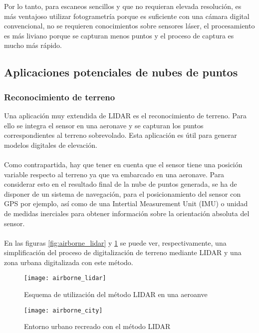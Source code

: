 
Por lo tanto, para escaneos sencillos y que no requieran elevada resolución, es más ventajoso utilizar fotogrametría porque es suficiente con una cámara digital convencional, no se requieren conocimientos sobre sensores láser, el procesamiento es más liviano porque se capturan menos puntos y el proceso de captura es mucho más rápido.

\subsection{Aplicaciones potenciales de nubes de puntos}
\subsubsection{Reconocimiento de terreno}
Una aplicación muy extendida de LIDAR es el reconocimiento de terreno. Para ello se integra el sensor en una aeronave y se capturan los puntos correspondientes al terreno sobrevolado. Esta aplicación es útil para generar modelos digitales de elevación.
\\
\\
Como contrapartida, hay que tener en cuenta que el sensor tiene una posición variable respecto al terreno ya que va embarcado en una aeronave. Para considerar esto en el resultado final de la nube de puntos generada, se ha de disponer de un sistema de navegación, para el posicionamiento del sensor con GPS por ejemplo, así como de una Intertial Measurement Unit (IMU) o unidad de medidas inerciales para obtener información sobre la orientación absoluta del sensor.
\\
\\
En las figuras \ref{fig:airborne_lidar} y \ref{fig:airborne_city} se puede ver, respectivamente, una simplificación del proceso de digitalización de terreno mediante LIDAR y una zona urbana digitalizada con este método.

 
\begin{figure}
  \texttt{[image: airborne\_lidar]}
  \caption{Esquema de utilización del método LIDAR en una aeroanve}\label{fig:airborne_lidar}
\endminipage\hfill
{}
  \texttt{[image: airborne\_city]}
  \caption{Entorno urbano recreado con el método LIDAR}\label{fig:airborne_city}
\endminipage\hfill

\end{figure}



